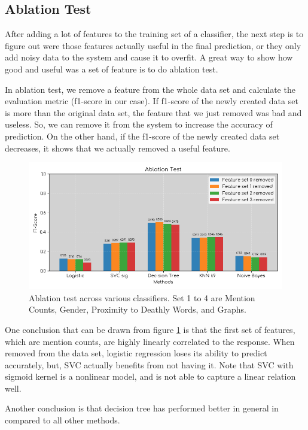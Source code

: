 \documentclass[letterpaper]{article}
\begin{document}
\subsection{Ablation Test}
After adding a lot of features to the training set of a classifier, the next step is to figure out were those features actually useful in the final prediction, or they only add noisy data to the system and cause it to overfit. A great way to show how good and useful was a set of feature is to do ablation test.

In ablation test, we remove a feature from the whole data set and calculate the evaluation metric (f1-score in our case). If f1-score of the newly created data set is more than the original data set, the feature that we just removed was bad and useless. So, we can remove it from the system to increase the accuracy of prediction. On the other hand, if the f1-score of the newly created data set decreases, it shows that we actually removed a useful feature.

\begin{figure}
	\centering
	\includegraphics[scale=.70]{ablation.png}
	\caption{Ablation test across various classifiers. Set 1 to 4 are Mention  Counts, Gender, Proximity to Deathly Words, and Graphs.}
	\label{fig:ablation}
\end{figure}

One conclusion that can be drawn from figure \ref{fig:ablation} is that the first set of features, which are mention counts, are highly linearly correlated to the response. When removed from the data set, logistic regression loses its ability to predict accurately, but, SVC actually benefits from not having it. Note that SVC with sigmoid kernel is a nonlinear model, and is not able to capture a linear relation well.

Another conclusion is that decision tree has performed better in general in compared to all other methods.
\end{document}
